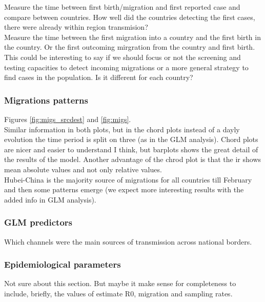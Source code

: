 \documentclass[12pt,]{article}
\begin{document}
 Measure the time between first birth/migration and first reported case and compare between countries. How well did the countries detecting the first cases, there were already within region transmision?\\

 Measure the time between the first migration into a country and the first birth in the country. Or the first outcoming mirgration from the country and first birth. This could be interesting to say if we should focus or not the screening and testing capacities to detect incoming migrations or a more general strategy to find cases in the population. Is it different for each country?\\


\subsubsection*{Migrations patterns}
Figures \ref{fig:migs_srcdest} and \ref{fig:migs}.\\


Similar information in both plots, but in the chord plots instead of a dayly evolution the time period is split on three (as in the GLM analysis). Chord plots are nicer and easier to understand I think, but barplots shows the great detail of the results of the model. Another advantage of the chrod plot is that the ir shows mean absolute values and not only relative values.\\

Hubei-China is the majority source of migrations for all countries till February and then some patterns emerge (we expect more interesting results with the added info in GLM analysis).\\



\subsubsection*{GLM predictors}
Which channels were the main sources of transmission across national borders.

\subsubsection*{Epidemiological parameters}

Not sure about this section. But maybe it make sense for completeness to include, briefly, the values of estimate R0, migration and sampling rates.
\end{document}
